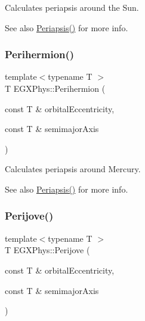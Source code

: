 Calculates periapsis around the Sun. 

\begin{DoxySeeAlso}{See also}
\mbox{\hyperlink{group___e_g_x_phys-_periapsis_ga4414ac75539371ec874a3d25cad6c9fe}{Periapsis()}} for more info. 
\end{DoxySeeAlso}
\mbox{\label{group___e_g_x_phys-_periapsis_ga9562e9cbfd73019ae9cdaa643b843d63}} 
\subsubsection{\texorpdfstring{Perihermion()}{Perihermion()}}
{\footnotesize\ttfamily template$<$typename T $>$ \\
T E\+G\+X\+Phys\+::\+Perihermion (\begin{DoxyParamCaption}\item[{const T \&}]{orbital\+Eccentricity,  }\item[{const T \&}]{semimajor\+Axis }\end{DoxyParamCaption})}



Calculates periapsis around Mercury. 

\begin{DoxySeeAlso}{See also}
\mbox{\hyperlink{group___e_g_x_phys-_periapsis_ga4414ac75539371ec874a3d25cad6c9fe}{Periapsis()}} for more info. 
\end{DoxySeeAlso}
\mbox{\label{group___e_g_x_phys-_periapsis_ga075052f7ff9aa1d5fdf4501b493be86b}} 
\subsubsection{\texorpdfstring{Perijove()}{Perijove()}}
{\footnotesize\ttfamily template$<$typename T $>$ \\
T E\+G\+X\+Phys\+::\+Perijove (\begin{DoxyParamCaption}\item[{const T \&}]{orbital\+Eccentricity,  }\item[{const T \&}]{semimajor\+Axis }\end{DoxyParamCaption})}



